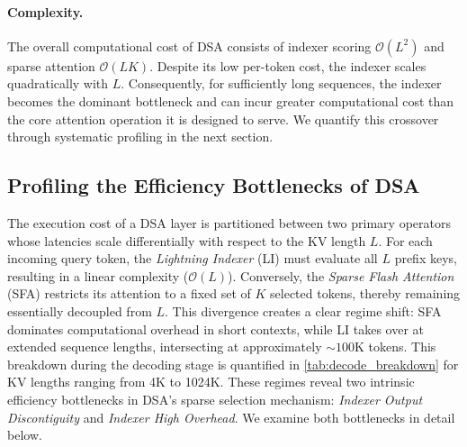 \documentclass{article}
\begin{document}
\paragraph{Complexity.}
The overall computational cost of DSA consists of indexer scoring $\mathcal{O}(L^2)$ and sparse attention $\mathcal{O}(LK)$. Despite its low per-token cost, the indexer scales quadratically with $L$. Consequently, for sufficiently long sequences, the indexer becomes the dominant bottleneck and can incur greater computational cost than the core attention operation it is designed to serve. We quantify this crossover through systematic profiling in the next section.

\subsection{Profiling the Efficiency Bottlenecks of DSA}
\label{sec:profiling}


The execution cost of a DSA layer is partitioned between two primary operators whose latencies scale differentially with respect to the KV length $L$. For each incoming query token, the \emph{Lightning Indexer} (LI) must evaluate all $L$ prefix keys, resulting in a linear complexity ($\mathcal{O}(L)$). Conversely, the \emph{Sparse Flash Attention} (SFA) restricts its attention to a fixed set of $K$ selected tokens, thereby remaining essentially decoupled from $L$. This divergence creates a clear regime shift: SFA dominates computational overhead in short contexts, while LI takes over at extended sequence lengths, intersecting at approximately ${\sim}100$K tokens. This breakdown during the decoding stage is quantified in \cref{tab:decode_breakdown} for KV lengths ranging from 4K to 1024K. These regimes reveal two intrinsic efficiency bottlenecks in DSA’s sparse selection mechanism: \emph{Indexer Output Discontiguity} and \emph{Indexer High Overhead}. We examine both bottlenecks in detail below.
\end{document}
